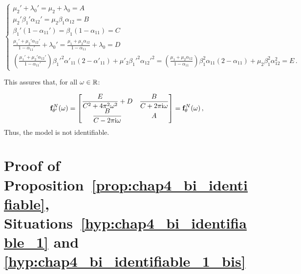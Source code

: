 \begin{subappendices}
\begin{itemize}
\begin{equation*}
\begin{cases}
  \mu_2' + \lambda_0' = \mu_2 + \lambda_0 = A\\
   \mu_2' \beta_1' \alpha_{12}' = \mu_2 \beta_1 \alpha_{12} = B\\
  \beta_1' (1-\alpha_{11}') = \beta_1 (1-\alpha_{11}) = C\\
  \frac{\mu_1' + \mu_2' \alpha_{12}'}{1-\alpha_{11}'} + \lambda_0' = \frac{\mu_1 + \mu_2 \alpha_{12}}{1-\alpha_{11}} + \lambda_0 = D\\
  \left(\frac{\mu_1' + \mu_2' \alpha_{12}'}{1-\alpha_{11}'} \right) {\beta_1'}^2 \alpha'_{11} (2-\alpha'_{11}) + \mu'_2 {\beta_1'}^2 {\alpha_{12}'}^2 = \left(\frac{\mu_1 + \mu_2 \alpha_{12}}{1-\alpha_{11}} \right) \beta_1^2 \alpha_{11} (2-\alpha_{11}) + \mu_2 \beta_1^2 \alpha_{12}^2 = E\,.
\end{cases}
\end{equation*}

This assures that, for all $\omega \in {\mathbb R}$:

\[
\mathbf{f}_{\theta'}^N(\omega) = \begin{bmatrix}
  \dfrac{E}{C^2 + 4 \pi^2 \omega^2} + D & \dfrac{B}{C + 2 \pi \mathrm{i} \omega}\\
  \dfrac{B}{C - 2 \pi \mathrm{i} \omega} & A
\end{bmatrix} 
= \mathbf{f}_{\theta}^N(\omega) \,,
\]
Thus, the model is not identifiable.
\end{itemize}










\section{Proof of Proposition~\ref{prop:chap4_bi_identifiable}, Situations~\ref{hyp:chap4_bi_identifiable_1} and \ref{hyp:chap4_bi_identifiable_1_bis}}\label{appendix:chap4_bi_identifiable_1}


\end{subappendices}
